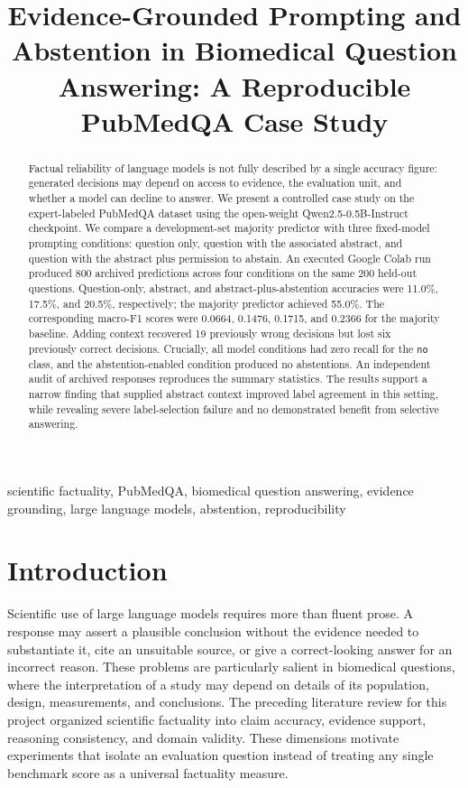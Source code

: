 \documentclass[conference]{IEEEtran}
\title{Evidence-Grounded Prompting and Abstention in Biomedical Question Answering: A Reproducible PubMedQA Case Study}
\author{\IEEEauthorblockN{Aditya Mohan Saha}\IEEEauthorblockA{MCL2026001\\Indian Institute of Information Technology, Allahabad}}
\begin{document}
\maketitle
\begin{abstract}
Factual reliability of language models is not fully described by a single accuracy figure: generated decisions may depend on access to evidence, the evaluation unit, and whether a model can decline to answer. We present a controlled case study on the expert-labeled PubMedQA dataset using the open-weight Qwen2.5-0.5B-Instruct checkpoint. We compare a development-set majority predictor with three fixed-model prompting conditions: question only, question with the associated abstract, and question with the abstract plus permission to abstain. An executed Google Colab run produced 800 archived predictions across four conditions on the same 200 held-out questions. Question-only, abstract, and abstract-plus-abstention accuracies were 11.0\%, 17.5\%, and 20.5\%, respectively; the majority predictor achieved 55.0\%. The corresponding macro-F1 scores were 0.0664, 0.1476, 0.1715, and 0.2366 for the majority baseline. Adding context recovered 19 previously wrong decisions but lost six previously correct decisions. Crucially, all model conditions had zero recall for the \texttt{no} class, and the abstention-enabled condition produced no abstentions. An independent audit of archived responses reproduces the summary statistics. The results support a narrow finding that supplied abstract context improved label agreement in this setting, while revealing severe label-selection failure and no demonstrated benefit from selective answering.
\end{abstract}
\begin{IEEEkeywords}
scientific factuality, PubMedQA, biomedical question answering, evidence grounding, large language models, abstention, reproducibility
\end{IEEEkeywords}

\section{Introduction}
Scientific use of large language models requires more than fluent prose. A response may assert a plausible conclusion without the evidence needed to substantiate it, cite an unsuitable source, or give a correct-looking answer for an incorrect reason. These problems are particularly salient in biomedical questions, where the interpretation of a study may depend on details of its population, design, measurements, and conclusions. The preceding literature review for this project organized scientific factuality into claim accuracy, evidence support, reasoning consistency, and domain validity. These dimensions motivate experiments that isolate an evaluation question instead of treating any single benchmark score as a universal factuality measure.
\end{document}
